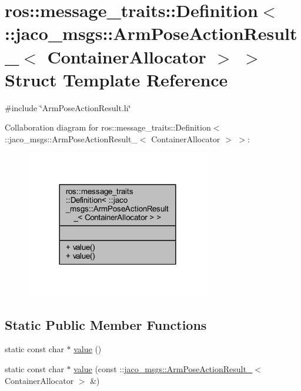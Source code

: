\hypertarget{structros_1_1message__traits_1_1Definition_3_01_1_1jaco__msgs_1_1ArmPoseActionResult___3_01ContainerAllocator_01_4_01_4}{}\section{ros\+:\+:message\+\_\+traits\+:\+:Definition$<$ \+:\+:jaco\+\_\+msgs\+:\+:Arm\+Pose\+Action\+Result\+\_\+$<$ Container\+Allocator $>$ $>$ Struct Template Reference}
\label{structros_1_1message__traits_1_1Definition_3_01_1_1jaco__msgs_1_1ArmPoseActionResult___3_01ContainerAllocator_01_4_01_4}


{\ttfamily \#include \char`\"{}Arm\+Pose\+Action\+Result.\+h\char`\"{}}



Collaboration diagram for ros\+:\+:message\+\_\+traits\+:\+:Definition$<$ \+:\+:jaco\+\_\+msgs\+:\+:Arm\+Pose\+Action\+Result\+\_\+$<$ Container\+Allocator $>$ $>$\+:
\nopagebreak
\begin{figure}[H]
\begin{center}
\leavevmode
\includegraphics[width=228pt]{d2/df0/structros_1_1message__traits_1_1Definition_3_01_1_1jaco__msgs_1_1ArmPoseActionResult___3_01Conta9304c54ba112ede9967123939499dda1}
\end{center}
\end{figure}
\subsection*{Static Public Member Functions}
\begin{DoxyCompactItemize}
\item 
static const char $\ast$ \hyperlink{structros_1_1message__traits_1_1Definition_3_01_1_1jaco__msgs_1_1ArmPoseActionResult___3_01ContainerAllocator_01_4_01_4_aaffb7b2fea0bb05b0e2068927f5c50b2}{value} ()
\item 
static const char $\ast$ \hyperlink{structros_1_1message__traits_1_1Definition_3_01_1_1jaco__msgs_1_1ArmPoseActionResult___3_01ContainerAllocator_01_4_01_4_ac1d73a85ffee4ba559660c9f8bd27fec}{value} (const \+::\hyperlink{structjaco__msgs_1_1ArmPoseActionResult__}{jaco\+\_\+msgs\+::\+Arm\+Pose\+Action\+Result\+\_\+}$<$ Container\+Allocator $>$ \&)
\end{DoxyCompactItemize}



